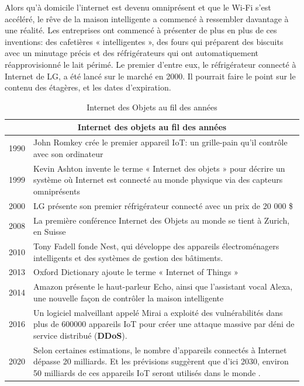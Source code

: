 Alors qu’à domicile l'internet est devenu omniprésent et que le Wi-Fi s'est accéléré, le rêve de la maison intelligente a commencé à ressembler davantage à une réalité. Les entreprises ont commencé à présenter de plus en plus de ces inventions: des cafetières « intelligentes », des fours qui préparent des biscuits avec un minutage précis et des réfrigérateurs qui ont automatiquement réapprovisionné le lait périmé. Le premier d'entre eux, le réfrigérateur connecté à Internet de LG, a été lancé sur le marché en 2000. Il pourrait faire le point sur le contenu des étagères, et les dates d'expiration.

\begin{table}[H]
	\begin{center}
		\begin{tabular}{|p{3cm}|p{8cm}|}
			\hline 
			\multicolumn{2}{|c|}{\textbf{Internet des objets au f{\kern0pt}il des années}} \\ 
			\hline 
			1990 & John Romkey crée le premier appareil IoT: un grille-pain qu'il contrôle avec son ordinateur \\ 
			\hline 
			1999 & Kevin Ashton invente le terme « Internet des objets » pour décrire un système où Internet est connecté au monde physique via des capteurs omniprésents \\ 
			\hline 
			2000 & LG présente son premier réfrigérateur connecté avec un prix de 20 000 \$ \\ 
			\hline 
			2008 & La première conférence Internet des Objets au monde se tient à Zurich, en Suisse \\ 
			\hline 
			2010 & Tony Fadell fonde Nest, qui développe des appareils électroménagers intelligents et des systèmes de gestion des bâtiments. \\ 
			\hline 
			2013 & Oxford Dictionary ajoute le terme « Internet of Things » \\ 
			\hline 
			2014 & Amazon présente le haut-parleur Echo, ainsi que l'assistant vocal Alexa, une nouvelle façon de contrôler la maison intelligente \\ 
			\hline 
			2016 & Un logiciel malveillant appelé Mirai a exploité des vulnérabilités dans plus de 600000 appareils IoT pour créer une attaque massive par déni de service distribué (\textbf{DDoS}). \\ 
			\hline 
			2020 & Selon certaines estimations, le nombre d'appareils connectés à Internet dépasse 20 milliards. Et les prévisions suggèrent que d'ici 2030, environ 50 milliards de ces appareils IoT seront utilisés dans le monde \cite{statista2020iot}.
			\\ 
			\hline 
		\end{tabular} 
	\end{center}
	\caption{Internet des Objets au f{\kern0pt}il des années}
\end{table}

